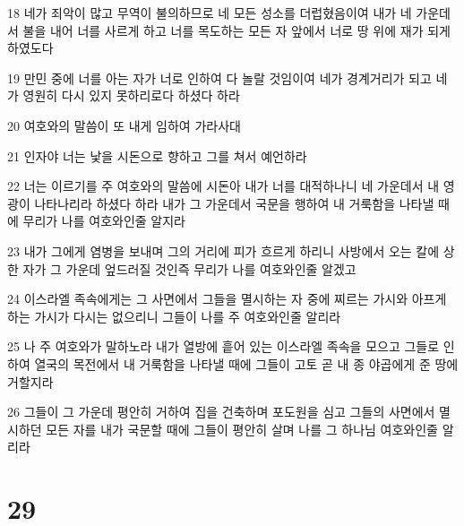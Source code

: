 \par 18 네가 죄악이 많고 무역이 불의하므로 네 모든 성소를 더럽혔음이여 내가 네 가운데서 불을 내어 너를 사르게 하고 너를 목도하는 모든 자 앞에서 너로 땅 위에 재가 되게 하였도다
\par 19 만민 중에 너를 아는 자가 너로 인하여 다 놀랄 것임이여 네가 경계거리가 되고 네가 영원히 다시 있지 못하리로다 하셨다 하라
\par 20 여호와의 말씀이 또 내게 임하여 가라사대
\par 21 인자야 너는 낯을 시돈으로 향하고 그를 쳐서 예언하라
\par 22 너는 이르기를 주 여호와의 말씀에 시돈아 내가 너를 대적하나니 네 가운데서 내 영광이 나타나리라 하셨다 하라 내가 그 가운데서 국문을 행하여 내 거룩함을 나타낼 때에 무리가 나를 여호와인줄 알지라
\par 23 내가 그에게 염병을 보내며 그의 거리에 피가 흐르게 하리니 사방에서 오는 칼에 상한 자가 그 가운데 엎드러질 것인즉 무리가 나를 여호와인줄 알겠고
\par 24 이스라엘 족속에게는 그 사면에서 그들을 멸시하는 자 중에 찌르는 가시와 아프게 하는 가시가 다시는 없으리니 그들이 나를 주 여호와인줄 알리라
\par 25 나 주 여호와가 말하노라 내가 열방에 흩어 있는 이스라엘 족속을 모으고 그들로 인하여 열국의 목전에서 내 거룩함을 나타낼 때에 그들이 고토 곧 내 종 야곱에게 준 땅에 거할지라
\par 26 그들이 그 가운데 평안히 거하여 집을 건축하며 포도원을 심고 그들의 사면에서 멸시하던 모든 자를 내가 국문할 때에 그들이 평안히 살며 나를 그 하나님 여호와인줄 알리라

\chapter{29}

